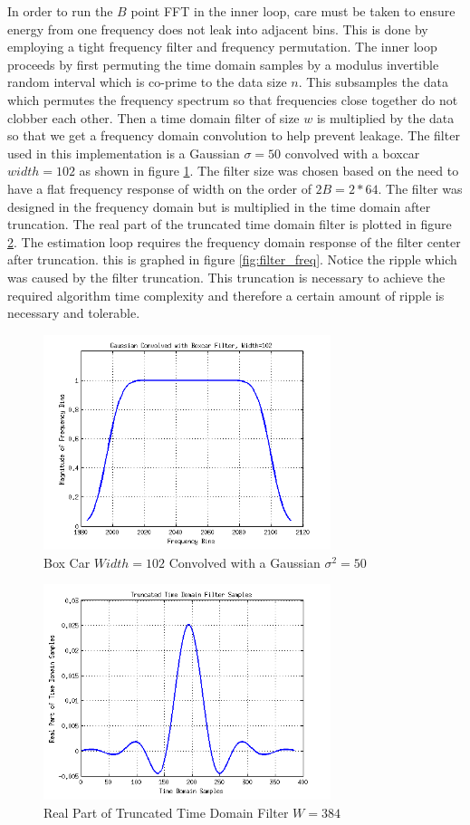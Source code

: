\documentclass[journal]{IEEEtran}
\begin{document}
\par In order to run the \(B\) point FFT in the inner loop, care must be taken to ensure energy from one frequency does not leak into adjacent bins. This is done by employing a tight frequency filter and frequency permutation. The inner loop proceeds by first permuting the time domain samples by a modulus invertible random interval which is co-prime to the data size \(n\). This subsamples the data which permutes the frequency spectrum so that frequencies close together do not clobber each other. Then a time domain filter of size \(w\) is multiplied by the data so that we get a frequency domain convolution to help prevent leakage. The filter used in this implementation is a Gaussian \(\sigma=50\) convolved with a boxcar \(width=102\) as shown in figure \ref{fig:gauss_boxcar}. The filter size was chosen based on the need to have a flat frequency response of width on the order of \(2B=2*64\). The filter was designed in the frequency domain but is multiplied in the time domain after truncation. The real part of the truncated time domain filter is plotted in figure \ref{fig:filter_time}. The estimation loop requires the frequency domain response of the filter center after truncation. this is graphed in figure \ref{fig:filter_freq}. Notice the ripple which was caused by the filter truncation. This truncation is necessary to achieve the required algorithm time complexity and therefore a certain amount of ripple is necessary and tolerable.

\begin{figure}[h]
\centering
\includegraphics[width=3.3in]{../images/gauss_boxcar.png}
\caption{Box Car \(Width=102\) Convolved with a Gaussian \(\sigma^2 = 50\)}
\label{fig:gauss_boxcar}
\end{figure}

\begin{figure}[h]
\centering
\includegraphics[width=3.3in]{../images/filter_time.png}
\caption{Real Part of Truncated Time Domain Filter \(W=384\)}
\label{fig:filter_time}
\end{figure}
\end{document}

